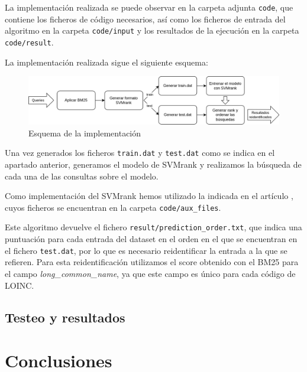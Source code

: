 \documentclass[a4paper,12pt]{article}
\begin{document}
	La implementación realizada se puede observar en la carpeta adjunta \texttt{code}, que contiene los ficheros de código necesarios, así como los ficheros de entrada del algoritmo en la carpeta \texttt{code/input} y los resultados de la ejecución en la carpeta \texttt{code/result}.
	
	La implementación realizada sigue el siguiente esquema:
	
	\begin{figure}[H]
		\centering
		\includegraphics[width=\textwidth]{include/esquema_implementacion.png}
		\caption{Esquema de la implementación}
	\end{figure}
	
	Una vez generados los ficheros \texttt{train.dat} y \texttt{test.dat} como se indica en el apartado anterior, generamos el modelo de SVMrank y realizamos la búsqueda de cada una de las consultas sobre el modelo. 
	
	Como implementación del SVMrank hemos utilizado la indicada en el artículo \cite{articulo-clase}, cuyos ficheros se encuentran en la carpeta \texttt{code/aux\_files}.
	
	Este algoritmo devuelve el fichero \texttt{result/prediction\_order.txt}, que indica una puntuación para cada entrada del dataset en el orden en el que se encuentran en el fichero \texttt{test.dat}, por lo que es necesario reidentificar la entrada a la que se refieren. Para esta reidentificación utilizamos el score obtenido con el BM25 para el campo \textit{long\_common\_name}, ya que este campo es único para cada código de LOINC.

	\subsection{Testeo y resultados}
	
	
	
	\section{Conclusiones}
	

	
	
	
	
\end{document}
